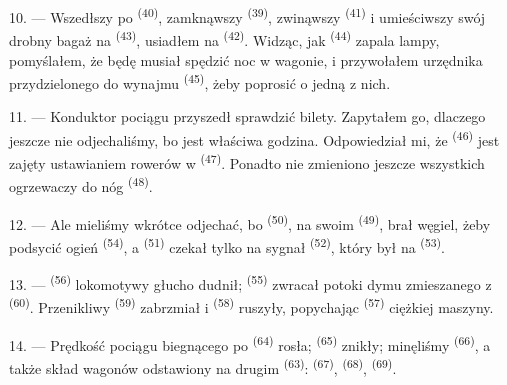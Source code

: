 \VUsaut{3.0mm}

10. --- Wszedłszy po  \textsuperscript{(40)}, zamknąwszy
 \textsuperscript{(39)}, zwinąwszy 
\textsuperscript{(41)} i umieściwszy swój drobny bagaż na 
\textsuperscript{(43)}, usiadłem na  \textsuperscript{(42)}. Widząc, jak
 \textsuperscript{(44)} zapala lampy, pomyślałem, że będę musiał
spędzić noc w wagonie, i przywołałem urzędnika przydzielonego do wynajmu
 \textsuperscript{(45)}, żeby poprosić o jedną z nich.

11. --- Konduktor pociągu przyszedł sprawdzić bilety. Zapytałem go, dlaczego jeszcze nie
odjechaliśmy, bo jest właściwa godzina. Odpowiedział mi, że 
\textsuperscript{(46)} jest zajęty ustawianiem rowerów w 
\textsuperscript{(47)}. Ponadto nie zmieniono jeszcze wszystkich ogrzewaczy do nóg
\textsuperscript{(48)}.

12. --- Ale mieliśmy wkrótce odjechać, bo  \textsuperscript{(50)}, na
swoim  \textsuperscript{(49)}, brał węgiel, żeby podsycić ogień
 \textsuperscript{(54)}, a 
\textsuperscript{(51)} czekał tylko na sygnał 
\textsuperscript{(52)}, który był na  \textsuperscript{(53)}.

13. ---  \textsuperscript{(56)} lokomotywy głucho dudnił; 
\textsuperscript{(55)} zwracał potoki dymu zmieszanego z 
\textsuperscript{(60)}. Przenikliwy  \textsuperscript{(59)} zabrzmiał i
 \textsuperscript{(58)} ruszyły, popychając 
\textsuperscript{(57)} ciężkiej maszyny.

\VUsaut{3.0mm}
\VUsaut{3.0mm}

14. --- Prędkość pociągu biegnącego po  \textsuperscript{(64)} rosła;
 \textsuperscript{(65)} znikły; minęliśmy 
\textsuperscript{(66)}, a także skład wagonów odstawiony na drugim 
\textsuperscript{(63)}:  \textsuperscript{(67)},  \textsuperscript{(68)},  \textsuperscript{(69)}.


